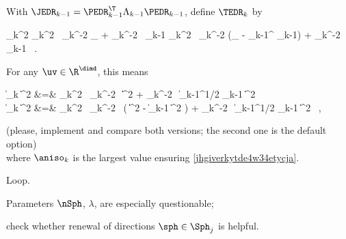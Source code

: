 \begin{mylist}
\begin{mylist}
\item
With \( \JEDR_{k-1} = \PEDR_{k-1}^{\T} \Lambda_{k-1} \PEDR_{k-1} \), define \( \TEDR_{k} \) by
\begin{EQA}[c]
	\TEDR_{k}^{2}
	\eqdef
	\aniso_{k}^{2} \, \hiso_{k}^{-2} \Id_{\dimd} + \hiso_{k}^{-2} \, \JEDR_{k-1}
	\quad
	\quad
	\aniso_{k}^{2} \, \hiso_{k}^{-2} (\Id_{\dimd} - \PEDR_{k-1}^{\T} \PEDR_{k-1}) + \hiso_{k}^{-2} \, \JEDR_{k-1}
	\, .
\end{EQA}
For any \( \uv \in \R^{\dimd} \), this means
\begin{EQA}[rcl]
	\| \TEDR_{k} \uv \|^{2}
	&=&
	\aniso_{k}^{2} \, \hiso_{k}^{-2} \, \| \uv \|^{2} + \hiso_{k}^{-2} \, \| \Lambda_{k-1}^{1/2} \PEDR_{k-1} \uv \|^{2}
	\\
	\quad
	\| \TEDR_{k} \uv \|^{2}
	&=&
	\aniso_{k}^{2} \, \hiso_{k}^{-2} \, \bigl( \| \uv \|^{2} - \| \PEDR_{k-1} \uv \|^{2} \bigr) 
	+ \hiso_{k}^{-2} \, \| \Lambda_{k-1}^{1/2} \PEDR_{k-1} \uv \|^{2}
	\, ,
\end{EQA}
{\color{blue} (please, implement and compare both versions; 
the second one is the default option)}
\\
where \( \aniso_{k} \) is the largest value ensuring \eqref{jhgiverkytde4w34etycja}.
\end{mylist}
\item Loop.
\end{mylist}

{\color{blue} 
\begin{mylist}

\item
Parameters \( \nSph \), \( \lambda \), are especially questionable;

\item
check whether renewal of directions \( \sph \in \Sph_{j} \) is helpful.


\end{mylist}

}


